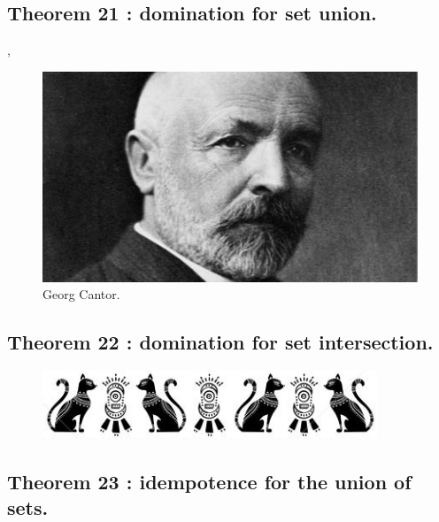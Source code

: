 \documentclass[preview]{standalone}
\begin{document}
\subsection[Domination for set union.]
    {
        \color{section}Theorem 21 \color{black} : domination for set union.
    }

\sep
\begin{figure}[!h]
    \centering
    \includegraphics[width=14cm]{../resources/jpg/2.2.set.operations/georg_cantor.jpg}
    \caption*{Georg Cantor.}
\end{figure}
\pagebreak


\subsection[Domination for set intersection.]
    {
        \color{section}Theorem 22 \color{black} : domination for set intersection.
    }

\vspace{1\baselineskip}
\begin{figure}[!h]
    \centering
    \includegraphics[width=10cm]{../resources/jpg/2.2.set.operations/border1.jpg}
\end{figure}


\subsection[Idempotence for the union of sets.]
    {
        \color{section}Theorem 23 \color{black} : idempotence for the union of sets.
    }

\pagebreak
\end{document}
